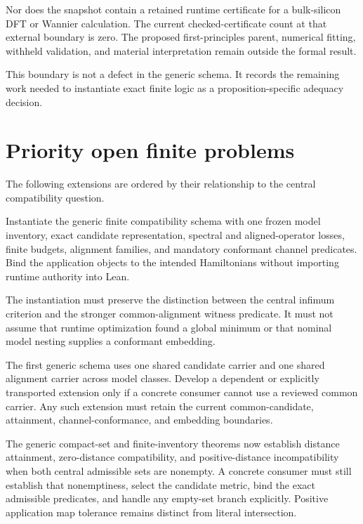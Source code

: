 Nor does the snapshot contain a retained runtime certificate for a bulk-silicon DFT or
Wannier calculation.  The current checked-certificate count at that external boundary
is zero.  The proposed first-principles parent, numerical fitting, withheld validation,
and material interpretation remain outside the formal result.

This boundary is not a defect in the generic schema.  It records the remaining work
needed to instantiate exact finite logic as a proposition-specific adequacy decision.

\section{Priority open finite problems}

The following extensions are ordered by their relationship to the central compatibility
question.

\begin{openproblem}
Instantiate the generic finite compatibility schema with one frozen model inventory,
exact candidate representation, spectral and aligned-operator losses, finite budgets,
alignment families, and mandatory conformant channel predicates.  Bind the application
objects to the intended Hamiltonians without importing runtime authority into Lean.
\end{openproblem}

The instantiation must preserve the distinction between the central infimum criterion
and the stronger common-alignment witness predicate.  It must not assume that runtime
optimization found a global minimum or that nominal model nesting supplies a conformant
embedding.

\begin{openproblem}
The first generic schema uses one shared candidate carrier and one shared alignment
carrier across model classes.  Develop a dependent or explicitly transported extension
only if a concrete consumer cannot use a reviewed common carrier.  Any such extension
must retain the current common-candidate, attainment, channel-conformance, and embedding
boundaries.
\end{openproblem}

\begin{openproblem}
The generic compact-set and finite-inventory theorems now establish distance attainment,
zero-distance compatibility, and positive-distance incompatibility when both central
admissible sets are nonempty.  A concrete consumer must still establish that nonemptiness,
select the candidate metric, bind the exact admissible predicates, and handle any empty-set
branch explicitly.  Positive application map tolerance remains distinct from literal
intersection.
\end{openproblem}

